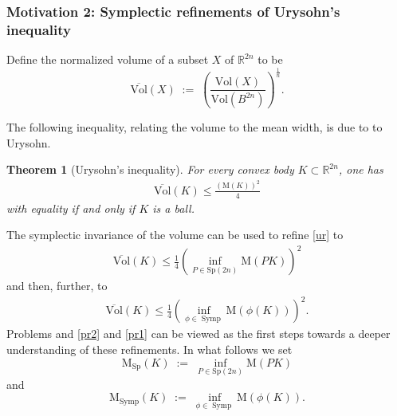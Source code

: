 \documentclass[12pt]{amsart}
\newtheorem{theorem}{Theorem}[section]
\theoremstyle{definition}
\newcommand{\eqdef}{\;{:=}\;}
\newcommand\Symp{\operatorname{Symp}}
\newcommand{\RR}{{\mathbb R}}
\newcommand{\mw}{{{\mathrm {M}}}}
\newcommand{\lmw}{{\mathrm {M}}_{\mathrm{Sp}}}
\newcommand{\nlmw}{\mathrm{M}_{{\Symp}}}
\newcommand{\sv}{{\overline{{\mathrm{Vol}}}}}
\begin{document}
\subsubsection{Motivation 2: Symplectic refinements of Urysohn's inequality} 






Define the normalized volume of a subset $X$ of $\RR^{2n}$ to be
$$\sv(X) \eqdef \left(\frac{\mathrm{Vol}(X)}{\mathrm{Vol}(B^{2n})} \right)^{\frac{1}{n}}.$$

The following inequality, relating the volume to the mean width, is due to to Urysohn.
\begin{theorem}[Urysohn's inequality]\label{ury} For every convex body $K \subset \RR^{2n}$, one has
\begin{align}\label{ur}
    \sv(K) \leq \frac{(\mw(K))^2}{4}
\end{align}
with equality if and only if $K$ is a ball. 
\end{theorem}
The symplectic invariance of the volume can be used to refine \eqref{ur} to
\begin{align}\label{ref1}
    \sv(K) \leq \frac{1}{4}\left(\inf_{P \in \mathrm{Sp} 
(2n)} \mw (PK)\right)^2 
\end{align}
and then, further, to
\begin{align}\label{ref2}
 \sv(K) \leq \frac{1}{4}\left(\inf_{\phi \in \Symp} \mw (\phi (K)) \right)^2.
\end{align}
Problems and \ref{pr2} and \ref{pr1}  can be viewed as the first steps towards a deeper understanding of these refinements. In what follows we set 
$$\lmw(K) \eqdef \inf_{P \in \mathrm{Sp} 
(2n)} \mw (PK)$$
and 
$$\nlmw(K) \eqdef \inf_{\phi \in \Symp} \mw (\phi (K)).$$
\end{document}
